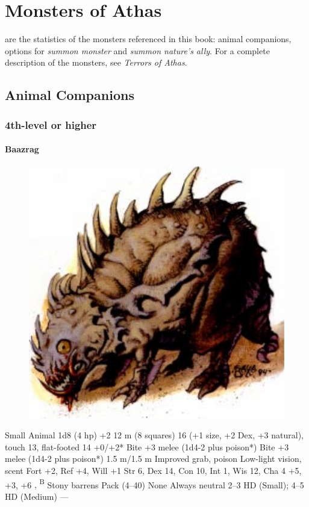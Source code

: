\chapter{Monsters of Athas}
 are the statistics of the monsters referenced in this book: animal companions, options for \emph{summon monster} and \emph{summon nature's ally}. For a complete description of the monsters, see \emph{Terrors of Athas}.

\section{Animal Companions}
\subsection{4th-level or higher}
\subsubsection{Baazrag}
\begin{figure}[b!]
\centering
\includegraphics[width=\columnwidth]{images/boneclaw.png}
\WOTC
\end{figure}
\begin{MonsterStats}
{Small Animal}
{1d8 (4 hp)}
{+2}
{12 m (8 squares)}
{16 (+1 size, +2 Dex, +3 natural), touch 13, flat-footed 14}
{+0/+2*}
{Bite +3 melee (1d4-2 plus poison*)}
{Bite +3 melee (1d4-2 plus poison*)}
{1.5 m/1.5 m}
{Improved grab, poison}
{Low-light vision, scent}
{Fort +2, Ref +4, Will +1}
{Str 6, Dex 14, Con 10, Int 1, Wis 12, Cha 4}
{ +5,  +3,  +6}
{, \textsuperscript{B}}
{Stony barrens}
{Pack (4--40)}
{\onehalf}
{None}
{Always neutral}
{2--3 HD (Small); 4--5 HD (Medium)}
{---}
\end{MonsterStats}

